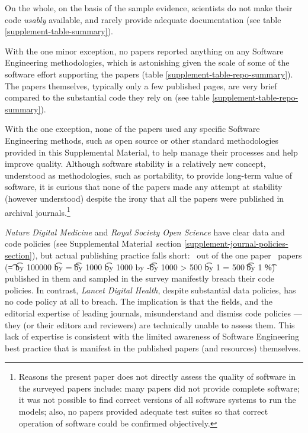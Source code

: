 \documentclass[10pt,a4paper]{article}
\def\supplement{Supplemental Material}
\def\pc#1#2{\t = #1%
\multiply \t by 100000%
\divide \t by #2%
\tu = \t
\divide \t by 1000%
\multiply \t by 1000%
\advance \tu by -\t%
\divide \t by 1000\relax%
\ifnum \tu > 500 %
	\advance \t by 1 
\else
	\ifnum \tu = 500 
		\ifodd \t %
			\advance \t by 1
		\else %
		\fi
	\fi
\fi
\the\t\%}
\def\plural#1#2{\ifnum #1=1 
	one #2%
\else
	\the#1\ #2s%
\fi}
\begin{document}
On the whole, on the basis of the sample evidence, scientists do not make their code \emph{usably\/} available, and rarely provide adequate documentation (see table \ref{supplement-table-summary}). 

With the one minor exception, no papers reported anything on any Software Engineering methodologies, which is astonishing given the scale of some of the software effort supporting the papers (table \ref{supplement-table-repo-summary}).  The papers themselves, typically only a few published pages, are very brief compared to the substantial code they rely on (see table \ref{supplement-table-repo-summary}). 

With the one exception, none of the papers used any specific Software Engineering methods, such as open source \cite{open-source} or other standard methodologies provided in this \supplement, to help manage their processes and help improve quality. Although software stability \cite{stability} is a relatively new concept, understood as methodologies, such as portability, to provide long-term value of software, it is curious that none of the papers made any attempt at stability (however understood) despite the irony that all the papers were published in archival journals.\footnote{Reasons the present paper does not directly assess the quality of software in the surveyed papers include: many papers did not provide complete software; it was not possible to find correct versions of all software systems to run the models; also, no papers provided adequate test suites so that correct operation of software could be confirmed objectively.}

\emph{Nature Digital Medicine\/} and \emph{Royal Society Open Science\/} have clear data and code policies (see \supplement\ section \ref{supplement-journal-policies-section}), but actual publishing practice falls short: \the\countHasBreach\ out of the \plural{\countHasPolicy}{paper} (\pc{\countHasBreach}{\countHasPolicy}) published in them and sampled in the survey manifestly breach their code policies. In contrast, \emph{Lancet Digital Health\/}, despite substantial data policies, has no code policy at all to breach. The implication is that the fields, and the editorial expertise of leading journals, misunderstand and dismiss code policies --- they (or their editors and reviewers) are technically unable to assess them. This lack of expertise is consistent with the limited awareness of Software Engineering best practice that is manifest in the published papers (and resources) themselves.
\end{document}
